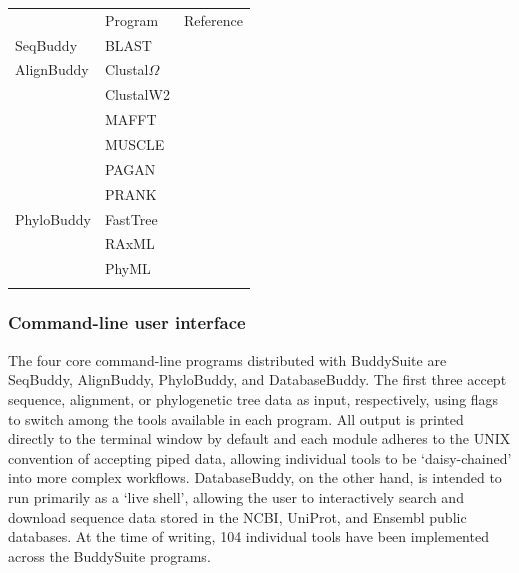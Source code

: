 \documentclass[nogrid]{MBE_article}%
\begin{document}
\begin{table}[!t]
      {\tabcolsep=5pt\begin{tabular}{@{\extracolsep{\fill}}lll@{}}
      \toprule
	   						& Program								& Reference
      \\\colrule
      SeqBuddy			& BLAST 								& \cite{Camacho2009}
      \\\colrule
      AlignBuddy		& Clustal$\Omega$					& \cite{Sievers:2011fn} \\
        					& ClustalW2 							& \cite{Larkin:2007hz} \\
							& MAFFT 								& \cite{Katoh:2013hm} \\
							& MUSCLE 								& \cite{Edgar:2004bo} \\
							& PAGAN 								& \cite{Loytynoja:2012fy} \\
        					& PRANK 								& \cite{Loytynoja:2005cb}		
      \\\colrule
      PhyloBuddy		& FastTree							& \cite{Price:2010eg} \\
        					& RAxML 								& \cite{Stamatakis:2006de} \\
        					& PhyML 								& \cite{Guindon:2010gf}
      \\\botrule
      \end{tabular}}
{}
\end{table}

\subsubsection{Command-line user interface}
The four core command-line programs distributed with BuddySuite are SeqBuddy, AlignBuddy, PhyloBuddy, and DatabaseBuddy. The first three accept sequence, alignment, or phylogenetic tree data as input, respectively, using flags to switch among the tools available in each program. All output is printed directly to the terminal window by default and each module adheres to the UNIX convention of accepting piped data, allowing individual tools to be `daisy-chained' into more complex workflows. DatabaseBuddy, on the other hand, is intended to run primarily as a `live shell', allowing the user to interactively search and download sequence data stored in the NCBI, UniProt, and Ensembl public databases. At the time of writing, 104 individual tools have been implemented across the BuddySuite programs.
\end{document}
